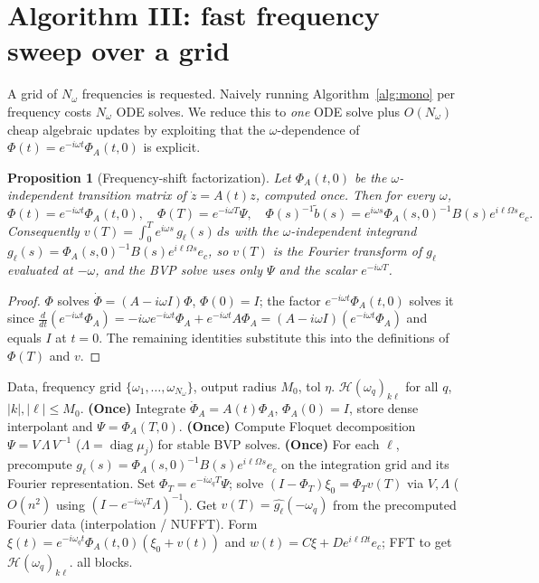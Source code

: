 \documentclass{amsart}
\newtheorem{proposition}{Proposition}
\theoremstyle{definition}
\DeclareMathOperator{\diag}{diag}
\newcommand{\Hcal}{\mathcal{H}}
\begin{document}
\section{Algorithm III: fast frequency sweep over a grid}\label{sec:lift}

A grid of $N_\omega$ frequencies is requested. Naively running
Algorithm~\ref{alg:mono} per frequency costs $N_\omega$ ODE solves. We reduce
this to \emph{one} ODE solve plus $O(N_\omega)$ cheap algebraic updates by
exploiting that the $\omega$-dependence of $\Phi(t)=e^{-i\omega t}\Phi_A(t,0)$ is
explicit.

\begin{proposition}[Frequency-shift factorization]\label{prop:shift}
Let $\Phi_A(t,0)$ be the $\omega$-independent transition matrix of
$\dot z=A(t)z$, computed once. Then for every $\omega$,
\begin{equation}\label{eq:shift}
\Phi(t)=e^{-i\omega t}\Phi_A(t,0),\quad
\Phi(T)=e^{-i\omega T}\Psi,\quad
\Phi(s)^{-1}\tilde b(s)=e^{i\omega s}\Phi_A(s,0)^{-1}B(s)e^{i\ell\Omega s}e_c .
\end{equation}
Consequently $v(T)=\int_0^T e^{i\omega s}\,g_\ell(s)\,ds$ with the
$\omega$-independent integrand $g_\ell(s)=\Phi_A(s,0)^{-1}B(s)e^{i\ell\Omega s}e_c$,
so $v(T)$ is the Fourier transform of $g_\ell$ evaluated at $-\omega$, and the
BVP solve uses only $\Psi$ and the scalar $e^{-i\omega T}$.
\end{proposition}

\begin{proof}
$\Phi$ solves $\dot\Phi=(A-i\omega I)\Phi$, $\Phi(0)=I$; the factor
$e^{-i\omega t}\Phi_A(t,0)$ solves it since
$\tfrac{d}{dt}(e^{-i\omega t}\Phi_A)=-i\omega e^{-i\omega t}\Phi_A+e^{-i\omega
t}A\Phi_A=(A-i\omega I)(e^{-i\omega t}\Phi_A)$ and equals $I$ at $t=0$. The
remaining identities substitute this into the definitions of $\Phi(T)$ and
$v$.
\end{proof}

\begin{algorithm}[H]
\caption{Fast HTF frequency sweep}\label{alg:sweep}
\begin{algorithmic}[1]
\Require Data, frequency grid $\{\omega_1,\dots,\omega_{N_\omega}\}$, output radius
$M_0$, tol $\eta$.
\Ensure $\Hcal(\omega_q)_{k\ell}$ for all $q$, $|k|,|\ell|\le M_0$.
\State \textbf{(Once)} Integrate $\dot\Phi_A=A(t)\Phi_A$, $\Phi_A(0)=I$, store
dense interpolant and $\Psi=\Phi_A(T,0)$.
\State \textbf{(Once)} Compute Floquet decomposition $\Psi=V\,\Lambda\,V^{-1}$
($\Lambda=\diag\mu_j$) for stable BVP solves.
\State \textbf{(Once)} For each $\ell$, precompute $g_\ell(s)=\Phi_A(s,0)^{-1}B(s)e^{i\ell\Omega s}e_c$
on the integration grid and its Fourier representation.
  \State Set $\Phi_T=e^{-i\omega_q T}\Psi$; solve $(I-\Phi_T)\xi_0=\Phi_T v(T)$
  via $V,\Lambda$ ($O(n^2)$ using $(I-e^{-i\omega_q T}\Lambda)^{-1}$).
  \State Get $v(T)=\widehat{g_\ell}(-\omega_q)$ from the precomputed Fourier data
  (interpolation / NUFFT).
  \State Form $\xi(t)=e^{-i\omega_q t}\Phi_A(t,0)(\xi_0+v(t))$ and
  $w(t)=C\xi+De^{i\ell\Omega t}e_c$; FFT to get $\Hcal(\omega_q)_{k\ell}$.
\EndFor
\State \Return all blocks.
\end{algorithmic}
\end{algorithm}
\end{document}
